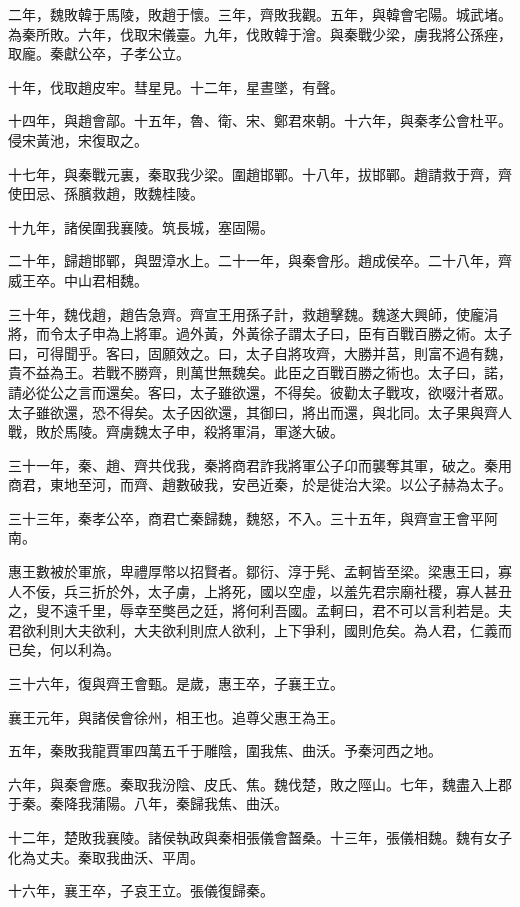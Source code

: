 二年，魏敗韓于馬陵，敗趙于懷。三年，齊敗我觀。五年，與韓會宅陽。城武堵。為秦所敗。六年，伐取宋儀臺。九年，伐敗韓于澮。與秦戰少梁，虜我將公孫痤，取龐。秦獻公卒，子孝公立。

十年，伐取趙皮牢。彗星見。十二年，星晝墜，有聲。

十四年，與趙會鄗。十五年，魯、衛、宋、鄭君來朝。十六年，與秦孝公會杜平。侵宋黃池，宋復取之。

十七年，與秦戰元裏，秦取我少梁。圍趙邯鄲。十八年，拔邯鄲。趙請救于齊，齊使田忌、孫臏救趙，敗魏桂陵。

十九年，諸侯圍我襄陵。筑長城，塞固陽。

二十年，歸趙邯鄲，與盟漳水上。二十一年，與秦會彤。趙成侯卒。二十八年，齊威王卒。中山君相魏。

三十年，魏伐趙，趙告急齊。齊宣王用孫子計，救趙擊魏。魏遂大興師，使龐涓將，而令太子申為上將軍。過外黃，外黃徐子謂太子曰，臣有百戰百勝之術。太子曰，可得聞乎。客曰，固願效之。曰，太子自將攻齊，大勝并莒，則富不過有魏，貴不益為王。若戰不勝齊，則萬世無魏矣。此臣之百戰百勝之術也。太子曰，諾，請必從公之言而還矣。客曰，太子雖欲還，不得矣。彼勸太子戰攻，欲啜汁者眾。太子雖欲還，恐不得矣。太子因欲還，其御曰，將出而還，與北同。太子果與齊人戰，敗於馬陵。齊虜魏太子申，殺將軍涓，軍遂大破。

三十一年，秦、趙、齊共伐我，秦將商君詐我將軍公子卬而襲奪其軍，破之。秦用商君，東地至河，而齊、趙數破我，安邑近秦，於是徙治大梁。以公子赫為太子。

三十三年，秦孝公卒，商君亡秦歸魏，魏怒，不入。三十五年，與齊宣王會平阿南。

惠王數被於軍旅，卑禮厚幣以招賢者。鄒衍、淳于髡、孟軻皆至梁。梁惠王曰，寡人不佞，兵三折於外，太子虜，上將死，國以空虛，以羞先君宗廟社稷，寡人甚丑之，叟不遠千里，辱幸至獘邑之廷，將何利吾國。孟軻曰，君不可以言利若是。夫君欲利則大夫欲利，大夫欲利則庶人欲利，上下爭利，國則危矣。為人君，仁義而已矣，何以利為。

三十六年，復與齊王會甄。是歲，惠王卒，子襄王立。

襄王元年，與諸侯會徐州，相王也。追尊父惠王為王。

五年，秦敗我龍賈軍四萬五千于雕陰，圍我焦、曲沃。予秦河西之地。

六年，與秦會應。秦取我汾陰、皮氏、焦。魏伐楚，敗之陘山。七年，魏盡入上郡于秦。秦降我蒲陽。八年，秦歸我焦、曲沃。

十二年，楚敗我襄陵。諸侯執政與秦相張儀會齧桑。十三年，張儀相魏。魏有女子化為丈夫。秦取我曲沃、平周。

十六年，襄王卒，子哀王立。張儀復歸秦。

